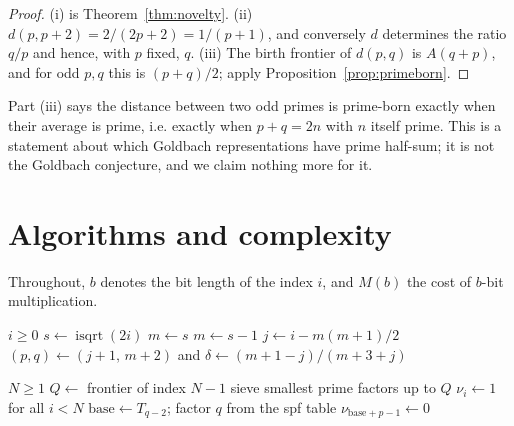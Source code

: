 \documentclass[11pt,a4paper]{article}
\theoremstyle{plain}
\theoremstyle{definition}
\theoremstyle{remark}
\newcommand{\isqrt}{\operatorname{isqrt}}
\begin{document}
\begin{proof}
(i) is Theorem~\ref{thm:novelty}. (ii) $d(p,p+2) = 2/(2p+2) = 1/(p+1)$, and
conversely $d$ determines the ratio $q/p$ and hence, with $p$ fixed, $q$. (iii)
The birth frontier of $d(p,q)$ is $A(q+p)$, and for odd $p,q$ this is
$(p+q)/2$; apply Proposition~\ref{prop:primeborn}.
\end{proof}

Part (iii) says the distance between two odd primes is prime-born exactly when
their average is prime, i.e. exactly when $p+q = 2n$ with $n$ itself prime. This
is a statement about which Goldbach representations have prime half-sum; it is
not the Goldbach conjecture, and we claim nothing more for it.

\section{Algorithms and complexity}
\label{sec:algorithms}

Throughout, $b$ denotes the bit length of the index $i$, and $M(b)$ the cost of
$b$-bit multiplication.

\begin{algorithm}[t]
\caption{Positional access: the $i$-th entry}
\label{alg:entry}
\begin{algorithmic}[1]
\Require $i \ge 0$
\State $s \gets \isqrt(2i)$ 
 $m \gets s$ \Else{} $m \gets s-1$ \EndIf
\State $j \gets i - m(m+1)/2$
\State \Return $(p,q) \gets (j+1,\, m+2)$ and $\delta \gets (m+1-j)/(m+3+j)$
\end{algorithmic}
\end{algorithm}

\begin{algorithm}[t]
\caption{The novelty mask on $[0,N)$, without gcd}
\label{alg:mask}
\begin{algorithmic}[1]
\Require $N \ge 1$
\State $Q \gets$ frontier of index $N-1$ 
\State sieve smallest prime factors up to $Q$ 
\State $\nu_i \gets 1$ for all $i < N$
  \State $\text{base} \gets T_{q-2}$; factor $q$ from the spf table
      \State $\nu_{\text{base}+p-1} \gets 0$
    \EndFor
  \EndFor
\EndFor
\end{algorithmic}
\end{algorithm}
\end{document}
